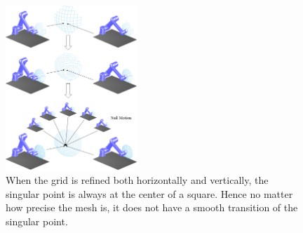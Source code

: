 \documentclass[Afour,sageh,times]{sagej}
\begin{document}
\begin{figure}[t]
\centering
\includegraphics[width = 0.44\textwidth]{figures/exp_central_sphere/pass_to_controller}
\caption{
When the grid is refined both horizontally and vertically, the singular point is always at the center of a square. Hence no matter how precise the mesh is, it does not have a smooth transition of the singular point. }\label{fig:bad_mesh}
\end{figure}
\end{document}
